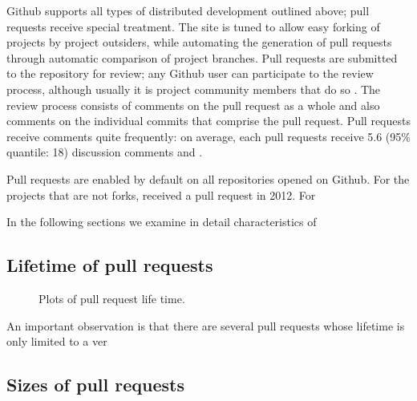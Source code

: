 \documentclass[conference]{IEEEtran}
\begin{document}
Github supports all types of distributed development outlined above;
pull requests receive special treatment. The site is tuned to allow easy forking
of projects by project outsiders, while automating the generation of pull
requests through automatic comparison of project branches. Pull requests are
submitted to the repository for review; any Github user can participate to the
review process, although usually it is project community members that do so
. The
review process consists of comments on the pull request as a whole and also
comments on the individual commits that comprise the pull request.
Pull requests receive comments quite frequently: on average, each pull
requests receive 5.6 (95\% quantile: 18) discussion comments and .

Pull requests are enabled by default on all repositories opened on Github.
For the projects that are not forks, 
received a pull request in 2012. For 

In the following sections we examine in detail characteristics of 

\subsection{Lifetime of pull requests}

\begin{figure*}
\centering
{}
\caption{Plots of pull request life time.}
\end{figure*}


An important observation is that there are several pull requests whose
lifetime is only limited to a ver

\subsection{Sizes of pull requests}
\end{document}
